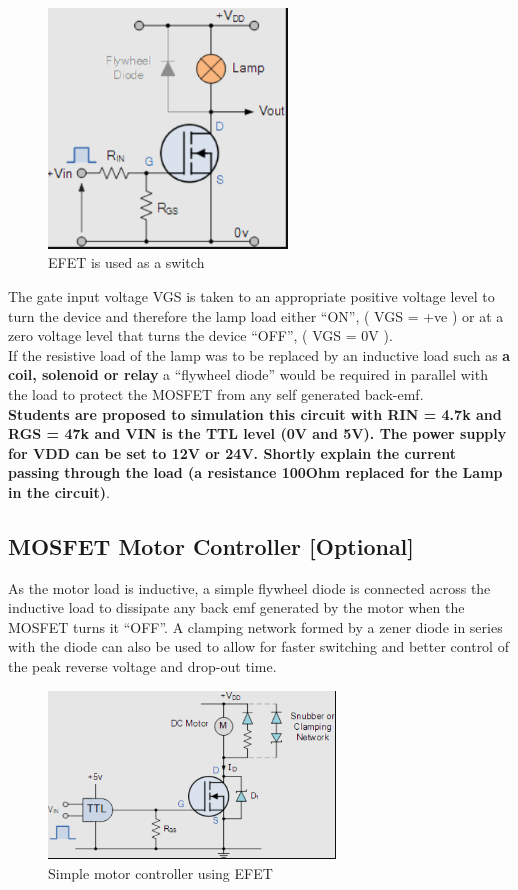 \begin{figure}[!htp]
    \centering
    \includegraphics[width = 2.5in]{source/picture/bai_6/fet_app_1.PNG}
    \caption{EFET is used as a switch}
    \label{fet_app_1}
\end{figure}

The gate input voltage VGS is taken to an appropriate positive voltage level to turn the device and therefore the lamp load either “ON”, ( VGS = +ve ) or at a zero voltage level that turns the device “OFF”, ( VGS = 0V ).\\

If the resistive load of the lamp was to be replaced by an inductive load such as \textbf{a coil, solenoid or relay} a “flywheel diode” would be required in parallel with the load to protect the MOSFET from any self generated back-emf.\\

\textbf{Students are proposed to simulation this circuit with RIN = 4.7k and RGS = 47k and VIN is the TTL level (0V and 5V). The power supply for VDD can be set to 12V or 24V. Shortly explain the current passing through the load (a resistance 100Ohm replaced for the Lamp in the circuit)}.

\subsection{MOSFET Motor Controller [Optional]}
As the motor load is inductive, a simple flywheel diode is connected across the inductive load to dissipate any back emf generated by the motor when the MOSFET turns it “OFF”. A clamping network formed by a zener diode in series with the diode can also be used to allow for faster switching and better control of the peak reverse voltage and drop-out time.

\newpage
\begin{figure}[!htp]
    \centering
    \includegraphics[width = 3in]{source/picture/bai_6/fet_app_2.PNG}
    \caption{Simple motor controller using EFET}
    \label{fet_app_2}
\end{figure}

